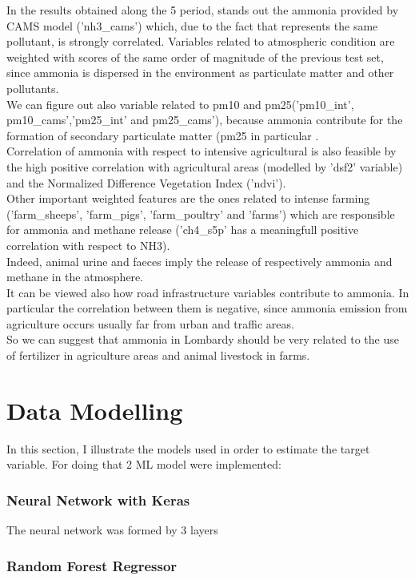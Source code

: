 In the results obtained along the 5 period, stands out the ammonia provided by CAMS model ('nh3\_cams') which, due to the fact that represents the same pollutant, is strongly correlated. Variables related to atmospheric condition are weighted with scores of the same order of magnitude of the previous test set, since ammonia is dispersed in the environment as particulate matter and other pollutants.\\
We can figure out also variable related to pm10 and pm25('pm10\_int', pm10\_cams','pm25\_int' and pm25\_cams'), because ammonia contribute for the formation of secondary particulate matter (pm25 in particular\cite{zhu2015sources} .\\
Correlation of ammonia with respect to intensive agricultural is also feasible by the high positive correlation with agricultural areas (modelled by 'dsf2' variable) and the Normalized Difference Vegetation Index ('ndvi').\\
Other important weighted features are the ones related to intense farming ('farm\_sheeps', 'farm\_pigs', 'farm\_poultry' and 'farms') which are responsible for ammonia and methane release ('ch4\_s5p' has a meaningfull positive correlation with respect to NH3).\\
Indeed, animal urine and faeces imply the release of respectively ammonia and methane in the atmosphere\cite{saggar2004review}.\\
It can be viewed also how road infrastructure variables contribute to ammonia. In particular the correlation between them is negative, since ammonia emission from agriculture occurs usually far from urban and traffic areas.\\
So we can suggest that ammonia in Lombardy should be very related to the use of fertilizer in agriculture areas and animal livestock in farms.
 




\section{Data Modelling}
In this section, I illustrate the models used in order to estimate the target variable. For doing that 2 ML model were implemented:

\subsubsection{Neural Network with Keras}
The neural network was formed by 3 layers
\subsubsection{Random Forest Regressor}

